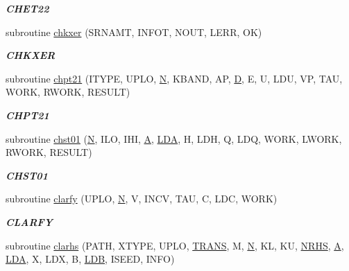 \begin{DoxyCompactItemize}
\begin{DoxyCompactList}\small\item\em {\bfseries C\+H\+E\+T22} \end{DoxyCompactList}\item 
subroutine \hyperlink{group__complex__eig_gaf0279384c87f94223fdf27a4d97f4f7d}{chkxer} (S\+R\+N\+A\+M\+T, I\+N\+F\+O\+T, N\+O\+U\+T, L\+E\+R\+R, O\+K)
\begin{DoxyCompactList}\small\item\em {\bfseries C\+H\+K\+X\+E\+R} \end{DoxyCompactList}\item 
subroutine \hyperlink{group__complex__eig_gaa33d87ed9b63b7751f2e0111cec1eb47}{chpt21} (I\+T\+Y\+P\+E, U\+P\+L\+O, \hyperlink{polmisc_8c_a0240ac851181b84ac374872dc5434ee4}{N}, K\+B\+A\+N\+D, A\+P, \hyperlink{odrpack_8h_a7dae6ea403d00f3687f24a874e67d139}{D}, E, U, L\+D\+U, V\+P, T\+A\+U, W\+O\+R\+K, R\+W\+O\+R\+K, R\+E\+S\+U\+L\+T)
\begin{DoxyCompactList}\small\item\em {\bfseries C\+H\+P\+T21} \end{DoxyCompactList}\item 
subroutine \hyperlink{group__complex__eig_ga30cd77400ba8f6d9e0cc2b316f549fb7}{chst01} (\hyperlink{polmisc_8c_a0240ac851181b84ac374872dc5434ee4}{N}, I\+L\+O, I\+H\+I, \hyperlink{classA}{A}, \hyperlink{example__user_8c_ae946da542ce0db94dced19b2ecefd1aa}{L\+D\+A}, H, L\+D\+H, Q, L\+D\+Q, W\+O\+R\+K, L\+W\+O\+R\+K, R\+W\+O\+R\+K, R\+E\+S\+U\+L\+T)
\begin{DoxyCompactList}\small\item\em {\bfseries C\+H\+S\+T01} \end{DoxyCompactList}\item 
subroutine \hyperlink{group__complex__eig_gab0239c5b213ef1d200099e057195d13f}{clarfy} (U\+P\+L\+O, \hyperlink{polmisc_8c_a0240ac851181b84ac374872dc5434ee4}{N}, V, I\+N\+C\+V, T\+A\+U, C, L\+D\+C, W\+O\+R\+K)
\begin{DoxyCompactList}\small\item\em {\bfseries C\+L\+A\+R\+F\+Y} \end{DoxyCompactList}\item 
subroutine \hyperlink{group__complex__eig_ga275bf58dfd5af715eea76b14ff5f6023}{clarhs} (P\+A\+T\+H, X\+T\+Y\+P\+E, U\+P\+L\+O, \hyperlink{superlu__enum__consts_8h_a0c4e17b2d5cea33f9991ccc6a6678d62a1f61e3015bfe0f0c2c3fda4c5a0cdf58}{T\+R\+A\+N\+S}, M, \hyperlink{polmisc_8c_a0240ac851181b84ac374872dc5434ee4}{N}, K\+L, K\+U, \hyperlink{example__user_8c_aa0138da002ce2a90360df2f521eb3198}{N\+R\+H\+S}, \hyperlink{classA}{A}, \hyperlink{example__user_8c_ae946da542ce0db94dced19b2ecefd1aa}{L\+D\+A}, X, L\+D\+X, B, \hyperlink{example__user_8c_a50e90a7104df172b5a89a06c47fcca04}{L\+D\+B}, I\+S\+E\+E\+D, I\+N\+F\+O)

\end{DoxyCompactItemize}
